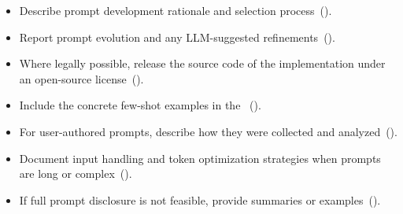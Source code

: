 \begin{itemize}[label={},leftmargin=*]
    \item \iconS Describe prompt development rationale and selection process~().
    \item \iconS Report prompt evolution and any LLM-suggested refinements~().
    \item \iconS Where legally possible, release the source code of the implementation under an open-source license~().
    \item \iconS {} Include the concrete few-shot examples in the \supplementarymaterial~().
    \item \iconS {} For user-authored prompts, describe how they were collected and analyzed~().
    \item \iconS {} Document input handling and token optimization strategies when prompts are long or complex~().
    \item \iconS {} If full prompt disclosure is not feasible, provide summaries or examples~().

\end{itemize}
